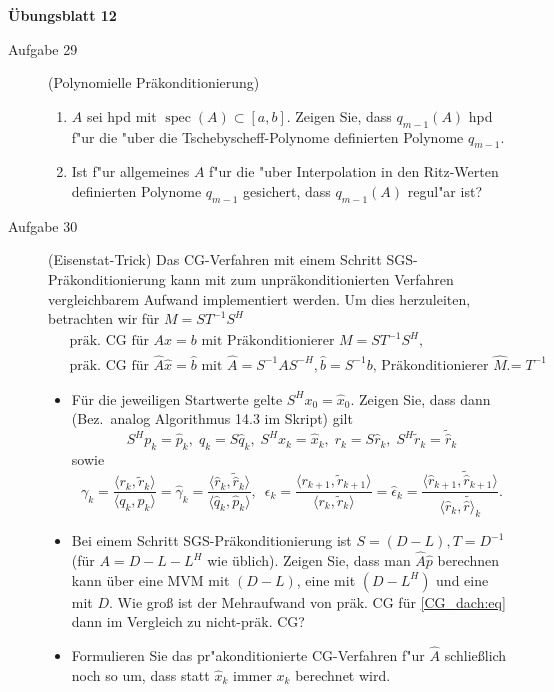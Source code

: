 \documentclass[a4paper,11pt]{scrartcl}
\DeclareMathOperator*{\spec}{spec}
\begin{document}
\aihead

\begin{center}
  {\large\textbf{Übungsblatt 12}}
\end{center}


\begin{description}
\item[Aufgabe 29] (Polynomielle Präkonditionierung)
\begin{enumerate}
\item $A$ sei hpd mit $\spec(A) \subset [a,b]$.  Zeigen Sie, dass $q_{m-1}(A)$ hpd f"ur die "uber die Tschebyscheff-Polynome definierten Polynome $q_{m-1}$.
\item Ist f"ur allgemeines $A$ f"ur die "uber Interpolation in den Ritz-Werten definierten Polynome $q_{m-1}$ gesichert, dass $q_{m-1}(A)$ regul"ar ist?
\end{enumerate}
\medskip
 
\item[Aufgabe 30] (Eisenstat-Trick)
Das CG-Verfahren mit einem Schritt SGS-Präkonditionierung kann mit zum unpräkonditionierten Verfahren vergleichbarem Aufwand implementiert werden.
 Um dies herzuleiten, betrachten wir für $M = ST^{-1}S^H$
\begin{align}
&\text{ präk.\ CG für $Ax = b$ mit Präkonditionierer $M = ST^{-1}S^H$}, \\
&\text{ präk.\ CG für $\hat A \hat x = \hat b$ mit $\hat A = S^{-1}AS^{-H}, \hat b = S^{-1}b$, Präkonditionierer $\hat M = T^{-1}$}.
\label{CG_dach:eq}
\end{align}

\begin{itemize}
\item Für die jeweiligen Startwerte gelte $S^Hx_0 = \hat x_0$. Zeigen Sie, dass dann (Bez.\ analog Algorithmus 14.3 im Skript) gilt
\[
S^Hp_k = \hat p_k, \; q_k = S \hat q_k, \; S^H x_k = \hat x_k, \;  r_k = S \hat r_k, \; S^H \tilde{r}_k =  \tilde{\hat{r}}_k
\]
sowie
\[
\gamma_k = \frac{\langle r_k, \tilde{r}_k \rangle}{\langle q_k, p_k \rangle} =
\hat \gamma_k = \frac{\langle \hat r_k, \tilde{\hat{r}}_k \rangle}{\langle \hat q_k, \hat p_k \rangle}, \enspace
\epsilon_k = \frac{\langle r_{k+1},\tilde{r}_{k+1}\rangle}{\langle r_{k},\tilde{r}_{k}\rangle} =
\hat \epsilon_k = \frac{\langle \hat r_{k+1},\tilde{\hat r}_{k+1}\rangle}{\langle \hat r_{k},\tilde{\hat r \rangle}_{k}}.
\]
\item Bei einem Schritt SGS-Präkonditionierung ist $S=(D-L), T = D^{-1}$ (für $A = D-L-L^H$ wie üblich). Zeigen Sie, dass man
$\hat A \hat p$ berechnen kann über eine MVM mit $(D-L)$, eine mit $(D-L^H)$ und eine mit $D$. Wie groß ist der Mehraufwand von präk. CG für \eqref{CG_dach:eq} dann im Vergleich zu nicht-präk. CG?
\item Formulieren Sie das pr"akonditionierte CG-Verfahren f"ur $\hat A$ schließlich noch so um, dass statt $\hat x_k$ immer $x_k$ berechnet wird.
\end{itemize}
\medskip
 

\end{description}
\end{document}
